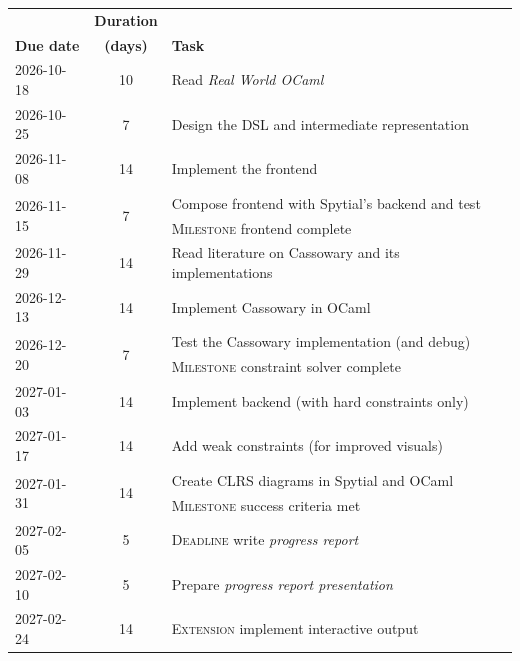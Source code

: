 \documentclass[a4paper, 12pt]{article}
\begin{document}
\begin{center}
    \begin{tabular}{@{}l@{\hspace{1em}}c@{\hspace{1em}}l@{}}
         & \textbf{Duration} & \\
        \textbf{Due date} & \textbf{(days)} & \textbf{Task} \\
        \hline
        2026-10-18 & 10 & Read \textit{Real World OCaml} \cite{realWorldOCaml} \\
        \hline
        2026-10-25 & 7 & Design the DSL and intermediate representation \\
        \hline
        2026-11-08 & 14 & Implement the frontend \\
        \hline
        \multirow{2}{*}{2026-11-15} & \multirow{2}{*}{7} & Compose frontend with Spytial's backend and test \\
         & & \textsc{Milestone} \hspace{1em} frontend complete \\
         \hline
        2026-11-29 & 14 & Read literature on Cassowary and its implementations \\
        \hline
        2026-12-13 & 14 & Implement Cassowary in OCaml \\
        \hline
        \multirow{2}{*}{2026-12-20} & \multirow{2}{*}{7} & Test the Cassowary implementation (and debug) \\
         & & \textsc{Milestone} \hspace{1em} constraint solver complete \\
         \hline
        2027-01-03 & 14 & Implement backend (with hard constraints only) \\
        \hline
        2027-01-17 & 14 & Add weak constraints (for improved visuals) \\
        \hline
        \multirow{2}{*}{2027-01-31} & \multirow{2}{*}{14} & Create CLRS diagrams in Spytial and OCaml \\
         & & \textsc{Milestone} \hspace{1em} success criteria met \\
         \hline
        2027-02-05 & 5 & \textsc{Deadline} \hspace{1em} write \textit{progress report} \\
        \hline
        2027-02-10 & 5 & Prepare \textit{progress report presentation} \\
        \hline
        2027-02-24 & 14 & \textsc{Extension} \hspace{1em} implement interactive output \\

\end{tabular}
\end{center}
\end{document}
